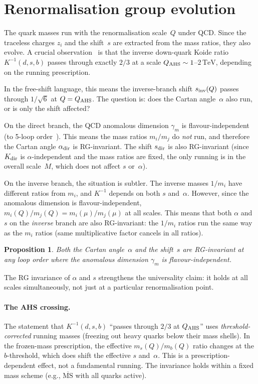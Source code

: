 \documentclass[preprint,12pt]{elsarticle}
\newtheorem{proposition}[theorem]{Proposition}
\newcommand{\TeV}{\,\mathrm{TeV}}
\begin{document}
\section{Renormalisation group evolution}
\label{sec:rg}

The quark masses run with the renormalisation scale~$Q$
under QCD.  Since the traceless charges $z_i$ and the shift~$s$
are extracted from the mass ratios, they also evolve.
A crucial observation~\cite{AHS:2005} is that the
inverse down-quark Koide ratio $K^{-1}(d,s,b)$ passes through
exactly $2/3$ at a scale $Q_{\rm AHS} \sim 1$--$2\TeV$,
depending on the running prescription.

In the free-shift language, this means the inverse-branch
shift $s_{\rm inv}(Q)$ passes through $1/\sqrt{6}$ at
$Q = Q_{\rm AHS}$.  The question is: does the Cartan
angle~$\alpha$ also run, or is only the shift affected?

On the direct branch, the QCD anomalous dimension
$\gamma_m$ is flavour-independent (to 5-loop
order~\cite{SMDR}).  This means the mass ratios
$m_i/m_j$ do \emph{not} run, and therefore the
Cartan angle $\alpha_{\rm dir}$ is RG-invariant.
The shift $s_{\rm dir}$ is also RG-invariant
(since $K_{\rm dir}$ is $\alpha$-independent and the
mass ratios are fixed, the only running is in the
overall scale~$M$, which does not affect $s$ or~$\alpha$).

On the inverse branch, the situation is subtler.
The inverse masses $1/m_i$ have different ratios from
$m_i$, and $K^{-1}$ depends on both $s$ and~$\alpha$.
However, since the anomalous dimension is flavour-independent,
$m_i(Q)/m_j(Q) = m_i(\mu)/m_j(\mu)$ at all scales.
This means that both $\alpha$ and $s$ on the \emph{inverse}
branch are also RG-invariant: the $1/m_i$ ratios run the
same way as the $m_i$ ratios (same multiplicative factor
cancels in all ratios).

\begin{proposition}
Both the Cartan angle~$\alpha$ and the shift~$s$
are RG-invariant at any loop order where the anomalous
dimension $\gamma_m$ is flavour-independent.
\end{proposition}

\noindent The RG invariance of $\alpha$ and $s$
strengthens the universality claim: it holds at all
scales simultaneously, not just at a particular
renormalisation point.

\paragraph{The AHS crossing.}
The statement that $K^{-1}(d,s,b)$ ``passes through $2/3$
at $Q_{\rm AHS}$'' uses \emph{threshold-corrected}
running masses (freezing out heavy quarks below their mass
shells).  In the frozen-mass prescription, the effective
$m_s(Q)/m_b(Q)$ ratio changes at the $b$-threshold, which
does shift the effective $s$ and~$\alpha$.
This is a prescription-dependent effect, not a fundamental
running.  The invariance holds within a fixed mass scheme
(e.g., $\overline{\mathrm{MS}}$ with all quarks active).
\end{document}
